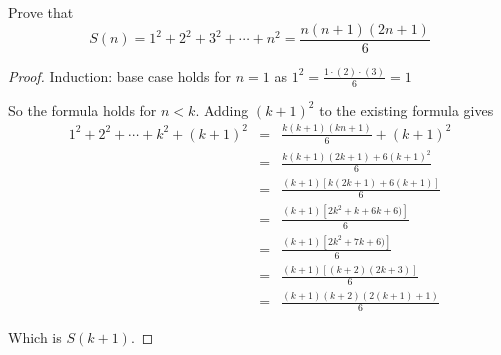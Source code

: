 \begin{statement}{1}
  Prove that
  \[
  S(n) = 1^2 + 2^2 + 3^2 + \cdots + n^2 = \frac{n(n+1)(2n+1)}{6}
  \]
\end{statement}
\begin{proof}
Induction: base case holds for $n=1$ as $1^2 = \frac{1\cdot(2)\cdot(3)}{6} = 1$

So the formula holds for $n < k$. Adding $(k+1)^2$ to the existing formula gives
\begin{eqnarray*}  
  1^2 + 2^2 + \cdots + k^2 + (k+1)^2  &=& \frac{k(k+1)(kn+1)}{6} + (k+1)^2 \\
  &=& \frac{k(k+1)(2k+1) + 6(k+1)^2}{6} \\
  &=& \frac{(k+1)[k(2k+1) + 6(k+1)]}{6} \\
  &=& \frac{(k+1)[2k^2+k + 6k+6)]}{6} \\
  &=& \frac{(k+1)[2k^2+7k +6)]}{6} \\
  &=& \frac{(k+1)[(k+2)(2k+3)]}{6} \\
  &=& \frac{(k+1)(k+2)(2(k+1)+1)}{6} 
\end{eqnarray*}

Which is $S(k+1)$.

\end{proof}
